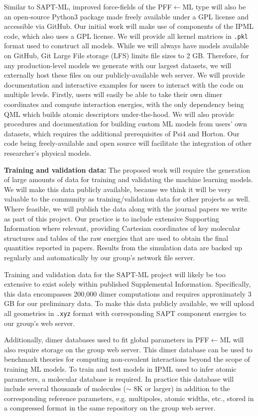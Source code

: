 \documentclass[12pt]{article}
\begin{document}
Similar to SAPT-ML, improved force-fields of the PFF$\leftarrow$ML
type will also be an open-source Python3 package made freely available
under a GPL license and accessible via GitHub.  Our initial work will
make use of components of the IPML code, which also uses a GPL license.
We will provide all kernel matrices in {\tt.pkl} format used to construct
all models.  While we will always have models available on GitHub, Git
Large File storage (LFS) limits file sizes to 2 GB. Therefore, for any
production-level models we generate with our largest datasets, we will
externally host these files on our publicly-available web server. We will
provide documentation and interactive examples for users to interact
with the code on multiple levels. Firstly, users will easily be able
to take their own dimer coordinates and compute interaction energies,
with the only dependency being {\sc QML} which builds atomic descriptors
under-the-hood.  We will also provide procedures and documentation for
building custom ML models from users' own datasets, which requires the
additional prerequisites of {\sc Psi4} and Horton.  Our code being
freely-available and open source will facilitate the integration of
other researcher's physical models.

{\bf Training and validation data:} The proposed work will require the
generation of large amounts of data for training and validating the
machine learning models.  We will make this data publicly available,
because we think it will be very valuable to the community as
training/validation data for other projects as well.  Where feasible,
we will publish the data along with the journal papers we write as
part of this project.  Our practice is to include extensive Supporting
Information where relevant, providing Cartesian coordinates of key
molecular structures and tables of the raw energies that are used
to obtain the final quantities reported in papers.  Results from the
simulation data are backed up regularly and automatically by our group's
network file server.

Training and validation data for the SAPT-ML project will likely be too
extensive to exist solely within published Supplemental Information.
Specifically, this data encompasses 200,000 dimer computations and
requires approximately 3 GB for our preliminary data.  To make this data
publicly available, we will upload all geometries in {\tt .xyz} format
with corresponding SAPT component energies to our group's web server.

Additionally, dimer databases used to fit global parameters
in PFF$\leftarrow$ML will also require storage on the group web
server. This dimer database can be used to benchmark theories for
computing non-covalent interactions beyond the scope of training
ML models.  To train and test models in IPML used to infer atomic
parameters, a molecular database is required. In practice this database
will include several thousands of molecules ($\sim$ 8K or larger) in
addition to the corresponding reference parameters, e.g. multipoles,
atomic widths, etc., stored in a compressed format in the same repository
on the group web server.
\end{document}
